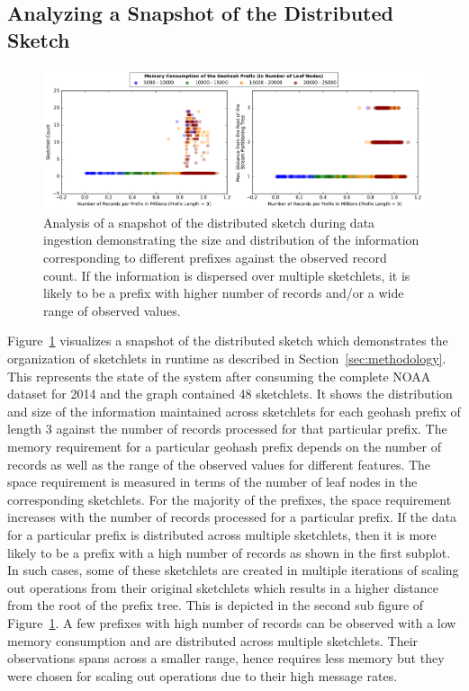 \subsection{Analyzing a Snapshot of the Distributed Sketch}
\begin{figure}[h!]
    \centerline{\includegraphics[width=\linewidth]{figures/scaleout_graph_analysis.pdf}}
    \caption{Analysis of a snapshot of the distributed sketch during data ingestion demonstrating the size and distribution of the information corresponding to different prefixes against the observed record count. If the information is dispersed over multiple sketchlets, it is likely to be a prefix with higher number of records and/or a wide range of observed values.}
    \label{fig:scaleout-graph-analysis}
\end{figure}
%
Figure~\ref{fig:scaleout-graph-analysis} visualizes a snapshot of the distributed sketch which demonstrates the organization of sketchlets in runtime as described in Section~\ref{sec:methodology}. 
This represents the state of the system after consuming the complete NOAA dataset for 2014 and the graph contained 48 sketchlets. 
It shows the distribution and size of the information maintained across sketchlets for each geohash prefix of length 3 against the number of records processed for that particular prefix.
The memory requirement for a particular geohash prefix depends on the number of records as well as the range of the observed values for different features.
The space requirement is measured in terms of the number of leaf nodes in the corresponding sketchlets.
For the majority of the prefixes, the space requirement increases with the number of records processed for a particular prefix.
If the data for a particular prefix is distributed across multiple sketchlets, then it is more likely to be a prefix with a high number of records as shown in the first subplot.
In such cases, some of these sketchlets are created in multiple iterations of scaling out operations from their original sketchlets which results in a higher distance from the root of the prefix tree. This is depicted in the second sub figure of Figure~\ref{fig:scaleout-graph-analysis}.
A few prefixes with high number of records can be observed with a low memory consumption and are distributed across multiple sketchlets.
Their observations spans across a smaller range, hence requires less memory but they were chosen for scaling out operations due to their high message rates. 


